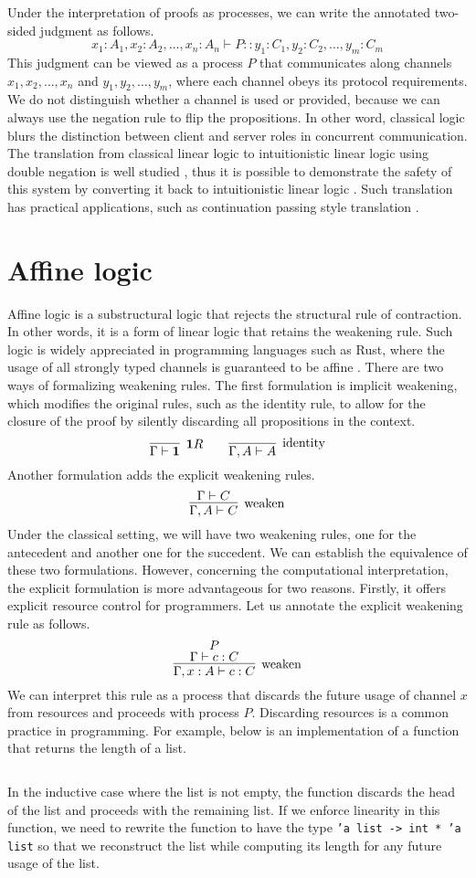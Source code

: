 \documentclass[12pt, openany]{memoir}
\begin{document}
Under the interpretation of proofs as processes, we can write the annotated two-sided judgment as follows.
\[
  x_1 : A_1, x_2 : A_2, \ldots, x_n : A_n \vdash P :: y_1 : C_1, y_2 : C_2, \ldots, y_m : C_m
\]
This judgment can be viewed as a process $P$ that communicates along channels $x_1, x_2, \ldots, x_n$
and $y_1, y_2, \ldots, y_m$, where each channel obeys its protocol requirements.
We do not distinguish whether a channel is used or provided, because we can always use the negation rule to flip the propositions.
In other word, classical logic blurs the distinction between client and server roles in concurrent communication.
The translation from classical linear logic to intuitionistic linear logic using double negation
is well studied \cite{Olivier2018}, 
thus it is possible to demonstrate the safety of this system by converting it back to intuitionistic linear logic \cite{Friedman1978}.
Such translation has practical applications, such as continuation passing style translation \cite{Appel1991}.
\section{Affine logic}
Affine logic is a substructural logic that rejects the structural rule of contraction. 
In other words, it is a form of linear logic that retains the weakening rule. 
Such logic is widely appreciated in programming languages such as Rust,
where the usage of all strongly typed channels is guaranteed to be affine \cite{Lagaillardie2022}.
There are two ways of formalizing weakening rules. 
The first formulation is implicit weakening, which modifies the original rules, 
such as the identity rule, to allow for the closure of the proof by silently discarding all propositions in the context.
\[
  \infer[\textbf{1}R]{\Gamma \vdash \textbf{1}}{}
  \qquad
  \infer[\text{identity}]{\Gamma, A \vdash A}{}
\]
Another formulation adds the explicit weakening rules.
\[
  \infer[\text{weaken}]{\Gamma, A \vdash C}{\Gamma \vdash C}
\]
Under the classical setting, we will have two weakening rules, one for the antecedent and another one for the succedent.
We can establish the equivalence of these two formulations. 
However, concerning the computational interpretation, the explicit formulation 
is more advantageous for two reasons.
Firstly, it offers explicit resource control for programmers. 
Let us annotate the explicit weakening rule as follows.
\[
  \infer[\text{weaken}]{\Gamma, x : A \vdash c : C}{
    \deduce{\Gamma \vdash c : C}{P}
  }
\]
We can interpret this rule as a process that discards the future usage of channel $x$ from resources and proceeds with process $P$. 
Discarding resources is a common practice in programming. For example, below is an implementation of a function that returns the length of a list.
\inputminted{ocaml}{code/length.ml}
In the inductive case where the list is not empty, 
the function discards the head of the list and proceeds with the remaining list. 
If we enforce linearity in this function, 
we need to rewrite the function to have the type \texttt{'a list -> int * 'a list}
so that we reconstruct the list while computing its length for any future usage of the list.  
\end{document}
